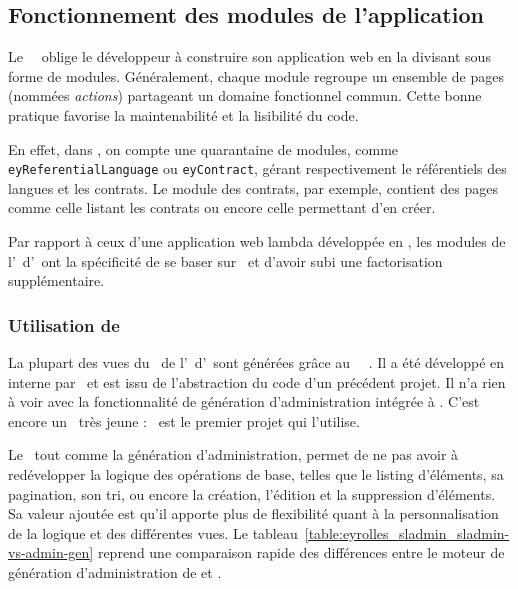 \subsection{Fonctionnement des modules de l'application}
\label{section:eyrolles_modules}

Le \afm\ \asf\ oblige le développeur à construire son application web en la divisant sous forme de modules. Généralement, chaque module regroupe un ensemble de pages (nommées \emph{actions}) partageant un domaine fonctionnel commun. Cette bonne pratique favorise la maintenabilité et la lisibilité du code.

En effet, dans \aey, on compte une quarantaine de modules, comme \texttt{ey\-Referential\-Language} ou \texttt{eyContract}, gérant respectivement le référentiels des langues et les contrats. Le module des contrats, par exemple, contient des pages comme celle listant les contrats ou encore celle permettant d'en créer.

Par rapport à ceux d'une application web lambda développée en \asf, les modules de l'\aintranet\ d'\aey\ ont la spécificité de se baser sur \asladmin\ et d'avoir subi une factorisation supplémentaire.


\subsubsection{Utilisation de \asladmin}

La plupart des vues du \alotdeux\ de l'\aintranet\ d'\aey\ sont générées grâce au \aplugin\ \asf\ \asladmin. Il a été développé en interne par \asl\ et est issu de l'abstraction du code d'un précédent projet. Il n'a rien à voir avec la fonctionnalité de génération d'administration intégrée à \asf. C'est encore un \aplugin\ très jeune : \aey\ est le premier projet qui l'utilise.

Le \aplugin\, tout comme la génération d'administration, permet de ne pas avoir à redévelopper la logique des opérations de base, telles que le listing d'éléments, sa pagination, son tri, ou encore la création, l'édition et la suppression d'éléments. Sa valeur ajoutée est qu'il apporte plus de flexibilité quant à la personnalisation de la logique et des différentes vues. Le tableau~\ref{table:eyrolles_sladmin_sladmin-vs-admin-gen} reprend une comparaison rapide des différences entre le moteur de génération d'administration de \asf et \asladmin.

